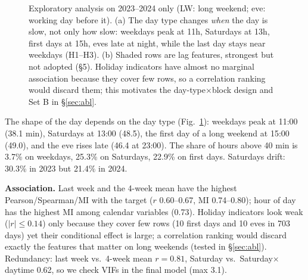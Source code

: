 \documentclass[11pt]{article}
\begin{document}
\begin{figure}[t]
\caption{Exploratory analysis on 2023--2024 only (LW: long weekend; eve: working day before it). (a) The day type changes \emph{when} the day is slow, not only how slow: weekdays peak at 11h, Saturdays at 13h, first days at 15h, eves late at night, while the last day stays near weekdays (H1--H3). (b) Shaded rows are lag features, strongest but not adopted (\S5). Holiday indicators have almost no marginal association because they cover few rows, so a correlation ranking would discard them; this motivates the day-type$\times$block design and Set B in \S\ref{sec:abl}.}\label{fig:hourly}
\end{figure}
The shape of the day depends on the day type (Fig.~\ref{fig:hourly}): weekdays peak at 11:00 (38.1 min), Saturdays at 13:00 (48.5), the first day of a long weekend at 15:00 (49.0), and the eve rises late (46.4 at 23:00). The share of hours above 40 min is 3.7\% on weekdays, 25.3\% on Saturdays, 22.9\% on first days. Saturdays drift: 30.3\% in 2023 but 21.4\% in 2024.

\noindent\textbf{Association.} Last week and the 4-week mean have the highest Pearson/Spearman/MI with the target ($r$ 0.60--0.67, MI 0.74--0.80); hour of day has the highest MI among calendar variables (0.73). Holiday indicators look weak ($|r|\le0.14$) only because they cover few rows (10 first days and 10 eves in 703 days) yet their conditional effect is large; a correlation ranking would discard exactly the features that matter on long weekends (tested in \S\ref{sec:abl}). Redundancy: last week vs.\ 4-week mean $r{=}0.81$, Saturday vs.\ Saturday$\times$daytime 0.62, so we check VIFs in the final model (max 3.1).
\end{document}
